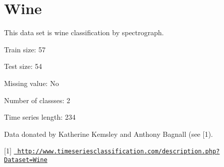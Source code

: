 \chapter{Wine}
\hypertarget{md_external_2data_2UCRArchive__2018_2Wine_2README}{}\label{md_external_2data_2UCRArchive__2018_2Wine_2README}
\label{md_external_2data_2UCRArchive__2018_2Wine_2README_autotoc_md230}%
%
 This data set is wine classification by spectrograph.

Train size\+: 57

Test size\+: 54

Missing value\+: No

Number of classses\+: 2

Time series length\+: 234

Data donated by Katherine Kemsley and Anthony Bagnall (see \mbox{[}1).

\mbox{[}1\mbox{]} \href{http://www.timeseriesclassification.com/description.php?Dataset=Wine}{\texttt{ http\+://www.\+timeseriesclassification.\+com/description.\+php?\+Dataset=\+Wine}} 
